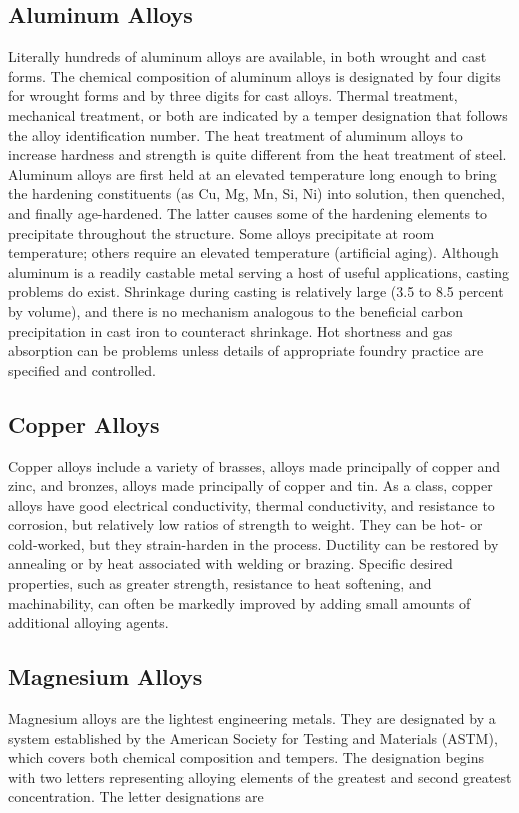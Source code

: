 \documentclass[a4paper,openany,12pt]{book}
\begin{document}
\subsection{Aluminum Alloys}
\label{sec:org0a6abdf}
Literally hundreds of aluminum alloys are available, in both wrought and
cast forms. The chemical composition of aluminum alloys is designated by
four digits for wrought forms and by three digits for cast alloys.
Thermal treatment, mechanical treatment, or both are indicated by a
temper designation that follows the alloy identification number. The
heat treatment of aluminum alloys to increase hardness and strength is
quite different from the heat treatment of steel. Aluminum alloys are
first held at an elevated temperature long enough to bring the hardening
constituents (as Cu, Mg, Mn, Si, Ni) into solution, then quenched, and
finally age-hardened. The latter causes some of the hardening elements
to precipitate throughout the structure. Some alloys precipitate at room
temperature; others require an elevated temperature (artificial aging).
Although aluminum is a readily castable metal serving a host of useful
applications, casting problems do exist. Shrinkage during casting is
relatively large (3.5 to 8.5 percent by volume), and there is no
mechanism analogous to the beneficial carbon precipitation in cast iron
to counteract shrinkage. Hot shortness and gas absorption can be
problems unless details of appropriate foundry practice are specified
and controlled.

\subsection{Copper Alloys}
\label{sec:org0d0915b}
Copper alloys include a variety of brasses, alloys made principally of
copper and zinc, and bronzes, alloys made principally of copper and tin.
As a class, copper alloys have good electrical conductivity, thermal
conductivity, and resistance to corrosion, but relatively low ratios of
strength to weight. They can be hot- or cold-worked, but they
strain-harden in the process. Ductility can be restored by annealing or
by heat associated with welding or brazing. Specific desired properties,
such as greater strength, resistance to heat softening, and
machinability, can often be markedly improved by adding small amounts of
additional alloying agents.

\subsection{Magnesium Alloys}
\label{sec:orgdcb772a}
Magnesium alloys are the lightest engineering metals. They are
designated by a system established by the American Society for Testing
and Materials (ASTM), which covers both chemical composition and
tempers. The designation begins with two letters representing alloying
elements of the greatest and second greatest concentration. The letter
designations are
\end{document}
